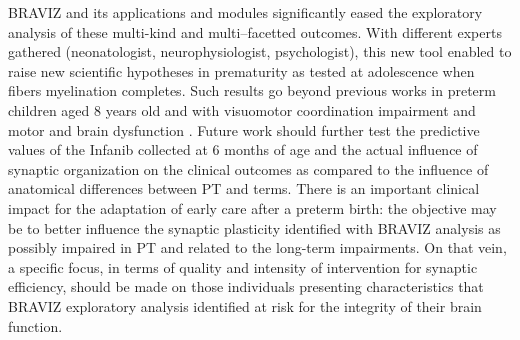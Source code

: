 \documentclass[twocolumn]{svjour3}
\begin{document}
BRAVIZ and its applications and modules significantly eased the exploratory analysis of these multi-kind and multi–facetted outcomes. With different experts gathered (neonatologist, neurophysiologist, psychologist), this new tool enabled to raise new scientific hypotheses in prematurity as tested at adolescence when fibers myelination completes. Such results go beyond previous works in preterm children aged 8 years old and with visuomotor coordination impairment and motor and brain dysfunction \cite{schneider_visuo-motor_2008,flamand_brain_2012}. Future work should further test the predictive values of the Infanib collected at 6 months of age and the actual influence of synaptic organization on the clinical outcomes as compared to the influence of anatomical differences between PT and terms. There is an important clinical impact for the adaptation of early care after a preterm birth: the objective may be to better influence the synaptic plasticity identified with BRAVIZ analysis as possibly impaired in PT and related to the long-term impairments. On that vein, a specific focus, in terms of quality and intensity of intervention for synaptic efficiency, should be made on those individuals presenting characteristics that BRAVIZ exploratory analysis identified at risk for the integrity of their brain function.
\end{document}
